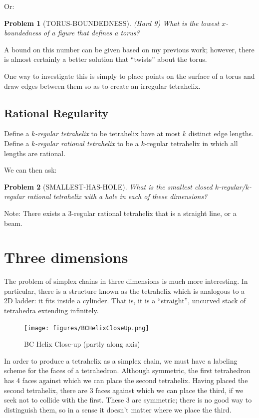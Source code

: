 \documentclass[11pt]{article}
\newtheorem{problem}{Problem}
\begin{document}
Or:

\begin{problem}[TORUS-BOUNDEDNESS]
(Hard 9)  What is the lowest $x$-boundedness of a figure that defines a torus?
  \end{problem}

A bound on this number can be given based on my previous work; however, there is almost certainly a better solution that ``twists'' about the torus.

One way to investigate this is simply to place points on the surface of a torus and draw edges between them so as to create an irregular tetrahelix.

\subsection{Rational Regularity}

Define a {\em $k$-regular tetrahelix} to be tetrahelix have at most $k$ distinct edge lengths.
Define a {\em $k$-regular rational tetrahelix} to be a $k$-regular tetrahelix in which all lengths are rational.

We can then ask:

\begin{problem}[SMALLEST-HAS-HOLE]
  What is the smallest closed $k$-regular/$k$-regular rational tetrahelix with a hole in each of these dimensions?
\end{problem}

Note: There exists a 3-regular rational tetrahelix that is a straight line, or a beam.


\section{Three dimensions}

The problem of simplex chains in three dimensions is much more interesting. In particular, there is a structure known as the
tetrahelix which is analogous to a 2D ladder: it fits inside a cylinder. That is, it is a ``straight'', uncurved stack
of tetrahedra extending infinitely.


\begin{figure}
  \centering
     \texttt{[image: figures/BCHelixCloseUp.png]}
     \caption{BC Helix Close-up (partly along axis)}
  \label{fig:closeup}     
\end{figure}



In order to produce a tetrahelix as a simplex chain, we must have a labeling scheme for the faces of a tetrahedron.
Although symmetric, the first tetrahedron has 4 faces against which we can place the second tetrahelix.
Having placed the second tetrahelix, there are 3 faces against which we can place the third, if we
seek not to collide with the first. These 3 are symmetric; there is no good way to distinguish them,
so in a sense it doesn't matter where we place the third.
\end{document}
